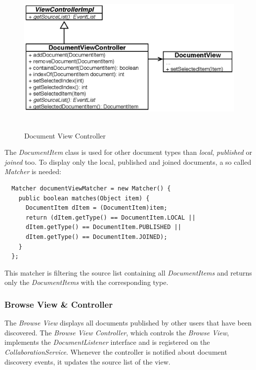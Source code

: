 \begin{figure}[H]
\begin{center}
  \includegraphics[height=2.99in, width=5.62in]{../images/finalreport/application_documentview.eps}
\caption{Document View Controller}
\label{application_documentview}
\end{center}
\end{figure}

The \textit{DocumentItem} class is used for other document types than \textit{local}, \textit{published} or \textit{joined} too. To display only the local, published and joined documents, a so called \textit{Matcher} is needed:
\begin{verbatim}
  Matcher documentViewMatcher = new Matcher() {
    public boolean matches(Object item) {
      DocumentItem dItem = (DocumentItem)item;
      return (dItem.getType() == DocumentItem.LOCAL ||
      dItem.getType() == DocumentItem.PUBLISHED ||
      dItem.getType() == DocumentItem.JOINED);
    }
  };
\end{verbatim}
This matcher is filtering the source list containing all \textit{DocumentItems} and returns only the \textit{DocumentItems} with the corresponding type.

\subsubsection{Browse View \& Controller}
The \textit{Browse View} displays all documents published by other users that have been discovered. The \textit{Browse View Controller}, which controls the \textit{Browse View}, implements the \textit{Document\-Listener} interface and is registered on the \textit{Collaboration\-Service}. Whenever the controller is notified about document discovery events, it updates the source list of the view.

